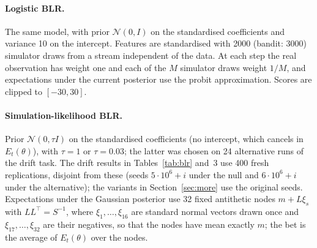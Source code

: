 \documentclass[11pt]{article}
\theoremstyle{remark}
\begin{document}
\paragraph{Logistic BLR.} The same model, with prior $\mathcal N(0, I)$ on the
standardised coefficients and variance 10 on the intercept. Features are
standardised with 2000 (bandit: 3000) simulator draws from a stream
independent of the data. At each step the real observation has weight one and
each of the $M$ simulator draws weight $1/M$, and expectations under the
current posterior use the probit approximation. Scores are clipped to
$[-30, 30]$.

\paragraph{Simulation-likelihood BLR.} Prior $\mathcal N(0, \tau I)$ on the
standardised coefficients (no intercept, which cancels in $E_t(\theta)$), with
$\tau = 1$ or $\tau = 0.03$; the latter was chosen on 24 alternative runs of the
drift task. The drift results in Tables~\ref{tab:blr} and~3
use 400 fresh replications, disjoint from these (seeds $5\cdot10^6+i$ under the
null and $6\cdot10^6+i$ under the alternative); the variants in Section~\ref{sec:more}
use the original seeds. Expectations under the Gaussian
posterior use 32 fixed antithetic nodes $m + L\xi_s$ with $LL^\top = S^{-1}$,
where $\xi_1, \ldots, \xi_{16}$ are standard normal vectors drawn once and
$\xi_{17}, \ldots, \xi_{32}$ are their negatives, so that the nodes have mean
exactly $m$; the bet is the average of $E_t(\theta)$ over the nodes.
\end{document}
